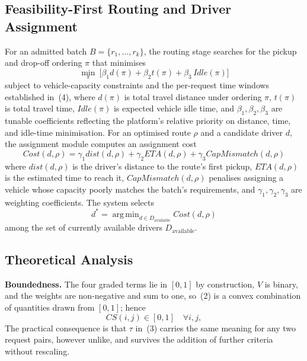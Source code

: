 \documentclass[conference]{IEEEtran}
\DeclareMathOperator*{\argmin}{arg\,min}
\begin{document}
\subsection{Feasibility-First Routing and Driver Assignment}
For an admitted batch $B=\{r_1,\dots,r_k\}$, the routing stage searches for
the pickup and drop-off ordering $\pi$ that minimises
\begin{equation}
\min_\pi\ \bigl[\beta_1 d(\pi)+\beta_2 t(\pi)+\beta_3\,\mathit{Idle}(\pi)\bigr]
\end{equation}
subject to vehicle-capacity constraints and the per-request time windows
established in~(4), where $d(\pi)$ is total travel distance under ordering
$\pi$, $t(\pi)$ is total travel time, $\mathit{Idle}(\pi)$ is expected vehicle
idle time, and $\beta_1,\beta_2,\beta_3$ are tunable coefficients reflecting
the platform's relative priority on distance, time, and idle-time
minimisation. For an optimised route $\rho$ and a candidate driver $d$, the
assignment module computes an assignment cost
\begin{equation}
\mathit{Cost}(d,\rho)=\gamma_1 \mathit{dist}(d,\rho)
 +\gamma_2 \mathit{ETA}(d,\rho)+\gamma_3 \mathit{CapMismatch}(d,\rho)
\end{equation}
where $\mathit{dist}(d,\rho)$ is the driver's distance to the route's first
pickup, $\mathit{ETA}(d,\rho)$ is the estimated time to reach it,
$\mathit{CapMismatch}(d,\rho)$ penalises assigning a vehicle whose capacity
poorly matches the batch's requirements, and $\gamma_1,\gamma_2,\gamma_3$ are
weighting coefficients. The system selects
\begin{equation}
d^{*}=\argmin_{d\in D_{\text{available}}}\mathit{Cost}(d,\rho)
\end{equation}
among the set of currently available drivers $D_{\text{available}}$.

\subsection{Theoretical Analysis}
\label{sec:props}

\textbf{Boundedness.} The four graded terms lie in $[0,1]$ by construction,
$V$ is binary, and the weights are non-negative and sum to one, so~(2) is a
convex combination of quantities drawn from $[0,1]$; hence
\begin{equation}
CS(i,j)\in[0,1]\quad\forall i,j,
\end{equation}
The practical consequence is that $\tau$ in~(3) carries the same meaning for
any two request pairs, however unlike, and survives the addition of further
criteria without rescaling.
\end{document}
